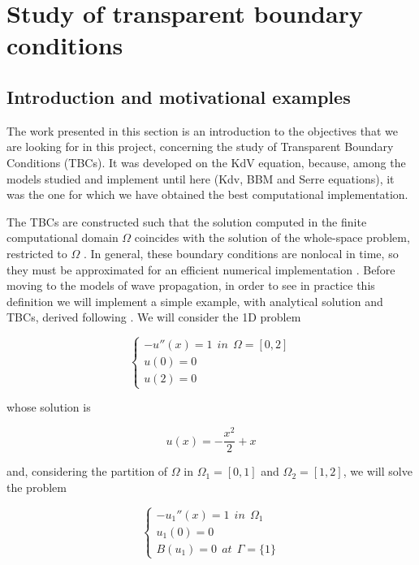 \section{Study of transparent boundary conditions}
\label{sec:TBC}

\subsection{Introduction and motivational examples}

\indent The work presented in this section is an introduction to the objectives that we are looking for in this project, concerning the study of Transparent Boundary Conditions (TBCs). It was developed on the KdV equation, because, among the models studied and implement until here (Kdv, BBM and Serre equations), it was the one for which we have obtained the best computational implementation.

\indent The TBCs are constructed such that the solution computed in the finite computational domain $\Omega$ coincides with the solution of the whole-space problem, restricted to $\Omega$ . In general, these boundary conditions are nonlocal in time,  so they must be approximated for an efficient numerical implementation \cite{Xavieretal2008}. Before moving to the models of wave propagation, in order to see in practice this definition we will implement a simple example, with analytical solution and TBCs, derived following \cite{Japhet2003}.  We will consider the 1D problem 

\begin{equation}
\begin{cases}
-u''(x) = 1 \ \ in \ \ \Omega = [0,2]\\
u(0) = 0 \\
u(2) = 0
\end{cases}
\end{equation}

\noindent whose solution is

$$u(x) = -\frac{x^2}{2} + x$$

\noindent and, considering the partition of $\Omega$ in $\Omega_1 = [0,1]$ and $\Omega_2 = [1,2]$, we will solve the problem

\begin{equation}
\begin{cases}
-u_1''(x) = 1 \ \ in \ \ \Omega_1\\
u_1(0) = 0 \\
B(u_1) = 0 \ \ at \ \ \Gamma=\{1\}
\end{cases}
\end{equation}

